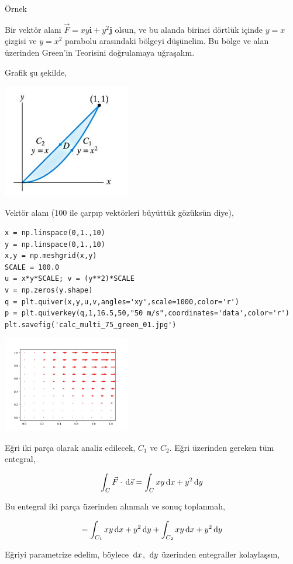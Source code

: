 \documentclass[12pt,fleqn]{article}\usepackage{../../common}
\begin{document}
Örnek

Bir vektör alanı $ \vec{F} = xy \textbf{i} + y^2 \textbf{j} $ olsun, ve bu
alanda birinci dörtlük içinde $y = x$ çizgisi ve $y=x^2$ parabolu arasındaki
bölgeyi düşünelim. Bu bölge ve alan üzerinden Green'in Teorisini doğrulamaya
uğraşalım.

Grafik şu şekilde,

\includegraphics[width=15em]{calc_multi_75_green_02.jpg}

Vektör alanı (100 ile çarpıp vektörleri büyüttük gözüksün diye),

\begin{verbatim}
x = np.linspace(0,1.,10)
y = np.linspace(0,1.,10)
x,y = np.meshgrid(x,y)
SCALE = 100.0
u = x*y*SCALE; v = (y**2)*SCALE
v = np.zeros(y.shape)
q = plt.quiver(x,y,u,v,angles='xy',scale=1000,color='r')
p = plt.quiverkey(q,1,16.5,50,"50 m/s",coordinates='data',color='r')
plt.savefig('calc_multi_75_green_01.jpg')
\end{verbatim}

\includegraphics[width=15em]{calc_multi_75_green_01.jpg}

Eğri iki parça olarak analiz edilecek, $C_1$ ve $C_2$.  Eğri üzerinden gereken
tüm entegral,

$$
\int_C \vec{F} \cdot \,\mathrm{d}{\vec{s}} = \int_C xy \,\mathrm{d} x + y^2 \,\mathrm{d} y
$$

Bu entegral iki parça üzerinden alınmalı ve sonuç toplanmalı,

$$
= \int_{C_1} xy \,\mathrm{d} x + y^2 \,\mathrm{d} y + \int_{C_2} xy \,\mathrm{d} x + y^2 \,\mathrm{d} y
\label{2}
$$

Eğriyi parametrize edelim, böylece $\,\mathrm{d} x$, $\,\mathrm{d} y$ üzerinden entegraller
kolaylaşsın,
\end{document}
